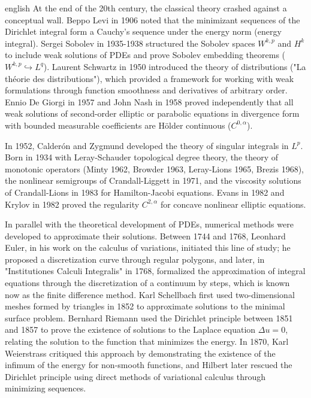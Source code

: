 \documentclass[0000.tex]{subfiles}
\begin{document}
\begin{hyphenrules}{english}
At the end of the 20th century, the classical theory crashed against a conceptual wall. Beppo Levi in 1906 noted that the minimizant sequences of the Dirichlet 
integral form a Cauchy's sequence under the energy norm (energy integral). Sergei Sobolev in 1935-1938 structured the Sobolev spaces $W^{k,p}$ and $H^k$ to include 
weak solutions of PDEs and prove Sobolev embedding theorems ($W^{k,p} \hookrightarrow L^q$). Laurent Schwartz in 1950 introduced the theory of distributions 
("La théorie des distributions"), which provided a framework for working with weak formulations through function smoothness and derivatives of arbitrary order. 
Ennio De Giorgi in 1957 and John Nash in 1958 proved independently that all weak solutions of second-order elliptic or parabolic equations in divergence form 
with bounded measurable coefficients are Hölder continuous ($C^{0,\alpha}$).

In 1952, Calderón and Zygmund developed the theory of singular integrals in $L^p$. Born in 1934 with Leray-Schauder topological degree theory, the theory of 
monotonic operators (Minty 1962, Browder 1963, Leray-Lions 1965, Brezis 1968), the nonlinear semigroups of Crandall-Liggett in 1971, and the viscosity solutions 
of Crandall-Lions in 1983 for Hamilton-Jacobi equations. Evans in 1982 and Krylov in 1982 proved the regularity $C^{2,\alpha}$ for concave nonlinear elliptic 
equations.

In parallel with the theoretical development of PDEs, numerical methods were developed to approximate their solutions. Between 1744 and 1768, Leonhard Euler, 
in his work on the calculus of variations, initiated this line of study; he proposed a discretization curve through regular polygons, and later, 
in "Institutiones Calculi Integralis" in 1768, formalized the approximation of integral equations through the discretization of a continuum by steps, 
which is known now as the finite difference method. Karl Schellbach first used two-dimensional meshes formed by triangles in 1852 to approximate solutions to 
the minimal surface problem. Bernhard Riemann used the Dirichlet principle between 1851 and 1857 to prove the existence of solutions to the Laplace equation 
$\Delta u = 0$, relating the solution to the function that minimizes the energy. In 1870, Karl Weierstrass critiqued this approach by demonstrating the existence 
of the infimum of the energy for non-smooth functions, and Hilbert later rescued the Dirichlet principle using direct methods of variational calculus through 
minimizing sequences.


\end{hyphenrules}
\end{document}
